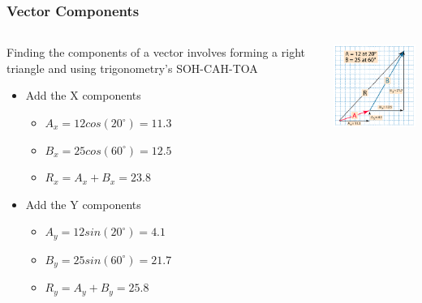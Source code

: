 \documentclass{beamer}
\begin{document}
\begin{frame}\frametitle{Vector Components}
\begin{columns}
\begin{column}{6cm}
Finding the components of a vector involves forming a right triangle and using trigonometry's SOH-CAH-TOA
\begin{itemize}
\item Add the X components
\begin{itemize}
\item $A_x = 12 cos(20^\circ) = 11.3$
\item $B_x = 25 cos(60^\circ) = 12.5$
\item $R_x = A_x + B_x = 23.8$
\end{itemize}
\item Add the Y components
\begin{itemize}
\item $A_y = 12 sin(20^\circ) = 4.1$
\item $B_y = 25 sin(60^\circ) = 21.7$
\item $R_y = A_y + B_y = 25.8$
\end{itemize}
\end{itemize}
\end{column}
\begin{column}{5cm}

\begin{center}
\includegraphics[width=4.8cm]{fig/vec2a.png}
\end{center}
\end{column}
\end{columns}
\end{frame}
\end{document}
